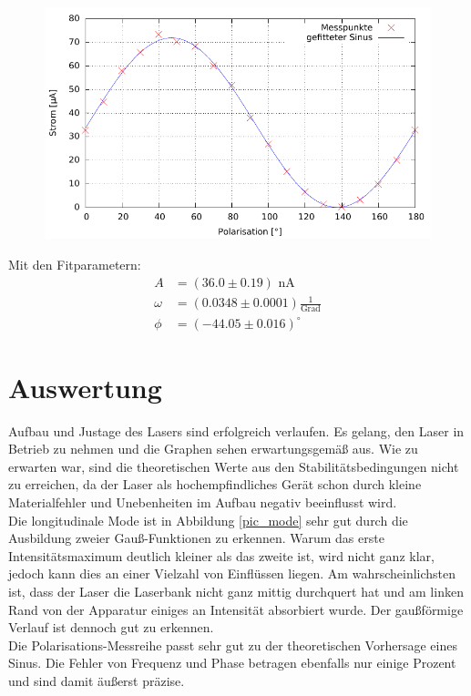 \begin{figure}[htbp]
\includegraphics[scale=1]{../gnu/Polarisation.pdf}
\end{figure}

Mit den Fitparametern:
\begin{align*}
A&=(36.0 \pm 0.19)\text{ nA} \\
\omega&=(0.0348 \pm 0.0001) \frac{1}{\text{Grad}}\\
\phi&=(-44.05 \pm 0.016) ^\circ
\end{align*}

\section{Auswertung}
Aufbau und Justage des Lasers sind erfolgreich verlaufen. Es gelang, den Laser in Betrieb zu nehmen und die Graphen sehen erwartungsgemäß aus. Wie zu erwarten war, sind die theoretischen Werte aus den Stabilitätsbedingungen nicht zu erreichen, da der Laser als hochempfindliches Gerät schon durch kleine Materialfehler und Unebenheiten im Aufbau negativ beeinflusst wird.\\

Die longitudinale Mode ist in Abbildung \ref{pic_mode} sehr gut durch die Ausbildung zweier Gauß-Funktionen zu erkennen. Warum das erste Intensitätsmaximum deutlich kleiner als das zweite ist, wird nicht ganz klar, jedoch kann dies an einer Vielzahl von Einflüssen liegen. Am wahrscheinlichsten ist, dass der Laser die Laserbank nicht ganz mittig durchquert hat und am linken Rand von der Apparatur einiges an Intensität absorbiert wurde. Der gaußförmige Verlauf ist dennoch gut zu erkennen.\\

Die Polarisations-Messreihe passt sehr gut zu der theoretischen Vorhersage eines Sinus. Die Fehler von Frequenz und Phase betragen ebenfalls nur einige Prozent und sind damit äußerst präzise.\\

